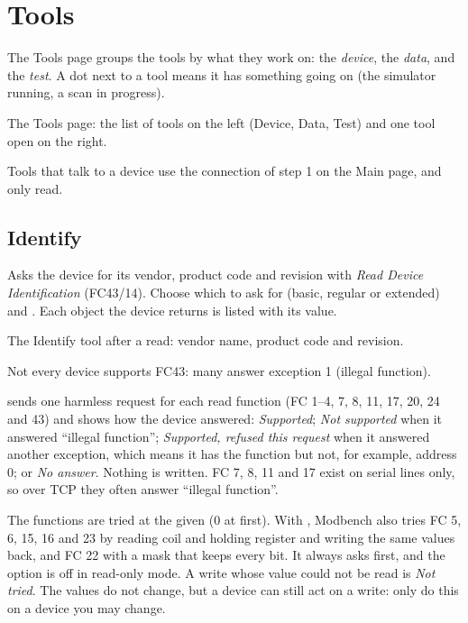 \chapter{Tools}
\label{ch:tools}

The Tools page groups the tools by what they work on: the \emph{device}, the
\emph{data}, and the \emph{test}. A dot next to a tool means it has something
going on (the simulator running, a scan in progress).

  {The Tools page: the list of tools on the left (Device, Data, Test) and one
   tool open on the right.}

Tools that talk to a device use the connection of step 1 on the Main page, and
only read.

\section{Identify}

Asks the device for its vendor, product code and revision with \emph{Read
Device Identification} (FC43/14). Choose which  to ask for (basic,
regular or extended) and . Each object the device
returns is listed with its value.

  {The Identify tool after a read: vendor name, product code and revision.}

Not every device supports FC43: many answer exception 1 (illegal function).

 sends one harmless request for each read function
(FC 1--4, 7, 8, 11, 17, 20, 24 and 43) and shows how the device answered:
\emph{Supported}; \emph{Not supported} when it answered ``illegal function'';
\emph{Supported, refused this request} when it answered another exception,
which means it has the function but not, for example, address 0; or
\emph{No answer}. Nothing is written. FC 7, 8, 11 and 17 exist on serial lines
only, so over TCP they often answer ``illegal function''.

The functions are tried at the  given (0 at first). With
, Modbench also tries FC 5, 6, 15, 16 and 23 by
reading coil and holding register  and writing the same values
back, and FC 22 with a mask that keeps every bit. It always asks first, and the
option is off in read-only mode. A write whose value could not be read is
\emph{Not tried}. The values do not change, but a device can still act on a
write: only do this on a device you may change.


